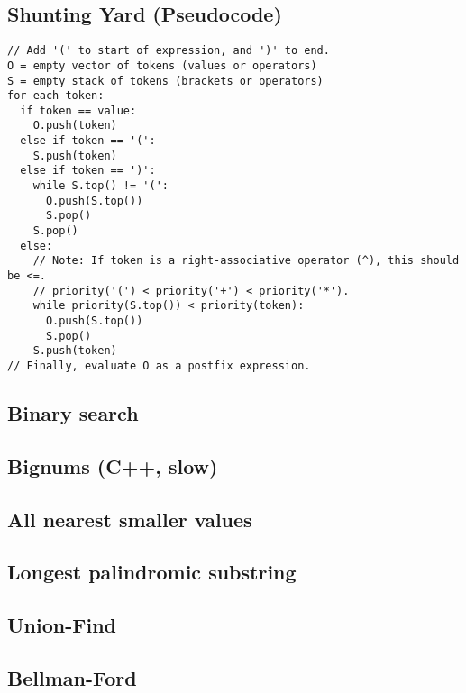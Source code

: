 \documentclass[9pt]{extarticle}
\begin{document}
\begin{multicols*}{3}
\subsection{Shunting Yard (Pseudocode)} %
\begin{lstlisting}
// Add '(' to start of expression, and ')' to end.
O = empty vector of tokens (values or operators)
S = empty stack of tokens (brackets or operators)
for each token:
  if token == value:
    O.push(token)
  else if token == '(':
    S.push(token)
  else if token == ')':
    while S.top() != '(':
      O.push(S.top())
      S.pop()
    S.pop()
  else:
    // Note: If token is a right-associative operator (^), this should be <=.
	// priority('(') < priority('+') < priority('*').
    while priority(S.top()) < priority(token):
      O.push(S.top())
      S.pop()
    S.push(token)
// Finally, evaluate O as a postfix expression.
\end{lstlisting}

\subsection{Binary search} %


\subsection{Bignums (C++, slow)} %


\subsection{All nearest smaller values} %


\subsection{Longest palindromic substring} %


\subsection{Union-Find}


\subsection{Bellman-Ford}



\end{multicols*}
\end{document}
